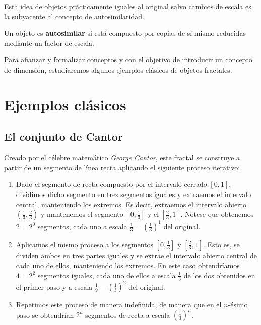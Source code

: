 \documentclass[11pt]{report}
\begin{document}
Esta idea de objetos prácticamente iguales al original salvo cambios de escala es la subyacente al concepto de autosimilaridad.

\begin{definicion}[Autosimilaridad] Un objeto es \textbf{autosimilar} si está compuesto por copias de sí mismo reducidas mediante un factor de escala.
\end{definicion}

Para afianzar y formalizar conceptos y con el objetivo de introducir un concepto de dimensión, estudiaremos algunos ejemplos clásicos de objetos fractales.

\section{Ejemplos clásicos}
\label{section:ejemplos}

\subsection{El conjunto de Cantor}
\label{subsection:Cantor}

Creado por el célebre matemático \textit{George Cantor}, este fractal se construye a partir de un segmento de línea recta aplicando el siguiente proceso iterativo:

\begin{enumerate}
\item Dado el segmento de recta compuesto por el intervalo cerrado $[0,1]$, dividimos dicho segmento en tres segmentos iguales y extraemos el intervalo central, manteniendo los extremos. Es decir, extraemos el intervalo abierto $\left(\frac 1 3, \frac 2 3\right)$ y mantenemos el segmento $\left[0,\frac 1 3\right]$ y el $\left[\frac 2 3, 1\right]$. Nótese que obtenemos $2=2^0$ segmentos, cada uno a escala $\frac 1 3=\left(\frac 1 3\right)^1$ del original.

\item Aplicamos el mismo proceso a los segmentos $\left[0,\frac 1 3\right]$ y $\left[\frac 2 3, 1\right]$. Esto es, se dividen ambos en tres partes iguales y se extrae el intervalo abierto central de cada uno de ellos, manteniendo los extremos. En este caso obtendríamos $4=2^2$ segmentos iguales, cada uno de ellos a escala $\frac 1 3$ de los dos obtenidos en el primer paso y a escala $\frac 1 9=\left(\frac 1 3\right)^2$ del original.

\item Repetimos este proceso de manera indefinida, de manera que en el $n$-ésimo paso se obtendrían $2^n$ segmentos de recta a escala $\left(\frac 1 3\right)^n$.
\end{enumerate} 
\end{document}
